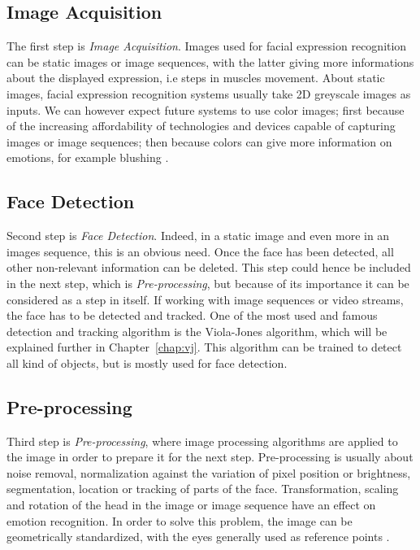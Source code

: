 \subsection{Image Acquisition}

\vspace{\baselineskip}
\noindent The first step is \textit{Image Acquisition}. Images used for facial expression recognition can be static images or image sequences, with the latter giving more informations about the displayed expression, i.e steps in muscles movement. About static images, facial expression recognition systems usually take 2D greyscale images as inputs. We can however expect future systems to use color images; first because of the increasing affordability of technologies and devices capable of capturing images or image sequences; then because colors can give more information on emotions, for example blushing \cite{CHI03}.
\newline

\subsection{Face Detection}

\vspace{\baselineskip}
\noindent Second step is \textit{Face Detection}. Indeed, in a static image and even more in an images sequence, this is an obvious need. Once the face has been detected, all other non-relevant information can be deleted. This step could hence be included in the next step, which is \textit{Pre-processing}, but because of its importance it can be considered as a step in itself. If working with image sequences or video streams, the face has to be detected and tracked. One of the most used and famous detection and tracking algorithm is the Viola-Jones algorithm, which will be explained further in Chapter~\ref{chap:vj}. This algorithm can be trained to detect all kind of objects, but is mostly used for face detection.
\newline

\subsection{Pre-processing}

\vspace{\baselineskip}
\noindent Third step is \textit{Pre-processing}, where image processing algorithms are applied to the image in order to prepare it for the next step. Pre-processing is usually about noise removal, normalization against the variation of pixel position or brightness, segmentation, location or tracking of parts of the face. Transformation, scaling and rotation of the head in the image or image sequence have an effect on emotion recognition. In order to solve this problem, the image can be geometrically standardized, with the eyes generally used as reference points \cite{CHI03}.
\newline

